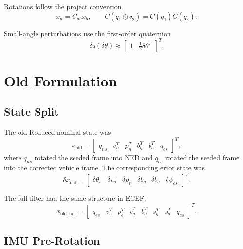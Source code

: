 \documentclass[11pt]{article}
\newcommand{\T}{^{T}}
\newcommand{\dq}{\delta q}
\begin{document}
Rotations follow the project convention
\begin{equation}
  x_a = C_{ab}x_b,
  \qquad
  C(q_1\otimes q_2)=C(q_1)C(q_2).
\end{equation}

Small-angle perturbations use the first-order quaternion
\begin{equation}
  \dq(\delta\theta) \approx
  \begin{bmatrix}1 & \frac{1}{2}\delta\theta\T\end{bmatrix}\T .
\end{equation}

\section{Old Formulation}

\subsection{State Split}

The old Reduced nominal state was
\begin{equation}
  x_{\mathrm{old}} =
  \begin{bmatrix}
  q_{ns} & v_n\T & p_n\T & b_g\T & b_a\T & q_{cs}
  \end{bmatrix}\T ,
\end{equation}
where \(q_{ns}\) rotated the seeded frame into NED and \(q_{cs}\) rotated the
seeded frame into the corrected vehicle frame. The corresponding error state
was
\begin{equation}
  \delta x_{\mathrm{old}} =
  \begin{bmatrix}
  \delta\theta_s &
  \delta v_n &
  \delta p_n &
  \delta b_g &
  \delta b_a &
  \delta\psi_{cs}
  \end{bmatrix}\T .
\end{equation}

The full filter had the same structure in ECEF:
\begin{equation}
  x_{\mathrm{old,full}} =
  \begin{bmatrix}
  q_{es} & v_e\T & p_e\T & b_g\T & b_a\T &
  s_g\T & s_a\T & q_{cs}
  \end{bmatrix}\T .
\end{equation}

\subsection{IMU Pre-Rotation}
\end{document}
